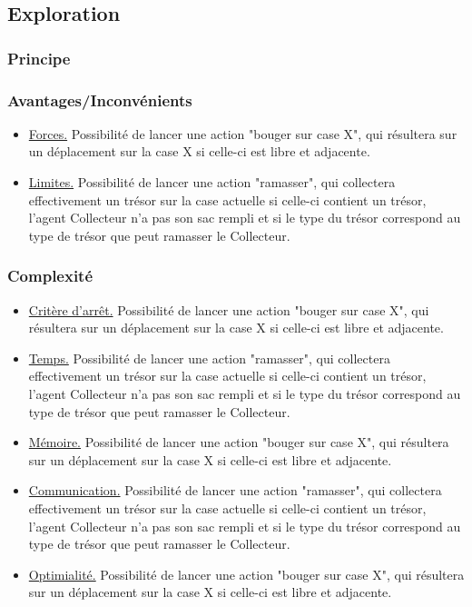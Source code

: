 \documentclass[a4paper, 10pt]{article}
\begin{document}
\subsection{Exploration}

\subsubsection{Principe}

\blindtext

\subsubsection{Avantages/Inconvénients}

\begin{itemize}
            \item \underline{Forces.} Possibilité de lancer une action "bouger sur case X", qui résultera sur un déplacement sur la case {X} si celle-ci est libre et adjacente.
            \item \underline{Limites.} Possibilité de lancer une action "ramasser", qui collectera effectivement un trésor sur la case actuelle si celle-ci contient un trésor, l'agent Collecteur n'a pas son sac rempli et si le type du trésor correspond au type de trésor que peut ramasser le Collecteur.
\end{itemize}


\subsubsection{Complexité}

\begin{itemize}
            \item \underline{Critère d'arrêt.} Possibilité de lancer une action "bouger sur case X", qui résultera sur un déplacement sur la case {X} si celle-ci est libre et adjacente.
            \item \underline{Temps.} Possibilité de lancer une action "ramasser", qui collectera effectivement un trésor sur la case actuelle si celle-ci contient un trésor, l'agent Collecteur n'a pas son sac rempli et si le type du trésor correspond au type de trésor que peut ramasser le Collecteur.
            \item \underline{Mémoire.} Possibilité de lancer une action "bouger sur case X", qui résultera sur un déplacement sur la case {X} si celle-ci est libre et adjacente.
            \item \underline{Communication.} Possibilité de lancer une action "ramasser", qui collectera effectivement un trésor sur la case actuelle si celle-ci contient un trésor, l'agent Collecteur n'a pas son sac rempli et si le type du trésor correspond au type de trésor que peut ramasser le Collecteur.
            \item \underline{Optimialité.} Possibilité de lancer une action "bouger sur case X", qui résultera sur un déplacement sur la case {X} si celle-ci est libre et adjacente.
\end{itemize}
\end{document}
